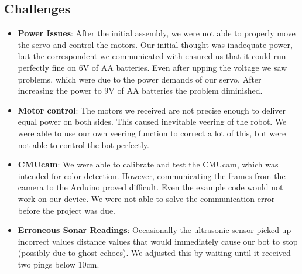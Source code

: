 \documentclass[11pt]{article}
\begin{document}
	\subsection{Challenges}
		
		\begin{itemize}				
		\item \textbf{Power Issues}: After the initial assembly, we were not able to properly move the servo and control the motors.  Our initial thought was inadequate power, but the correspondent we communicated with ensured us that it could run perfectly fine on 6V of AA batteries.  Even after upping the voltage we saw problems, which were due to the power demands of our servo.  After increasing the power to 9V of AA batteries the problem diminished.
		\item \textbf{Motor control}: The motors we received are not precise enough to deliver equal power on both sides.  This caused inevitable veering of the robot.  We were able to use our own veering function to correct a lot of this, but were not able to control the bot perfectly.
		\item \textbf{CMUcam}: We were able to calibrate and test the CMUcam, which was intended for color detection.  However, communicating the frames from the camera to the Arduino proved difficult.  Even the example code would not work on our device. We were not able to solve the communication error before the project was due.
		\item \textbf{Erroneous Sonar Readings}: Occasionally the ultrasonic sensor picked up incorrect values distance values that would immediately cause our bot to stop (possibly due to ghost echoes).  We adjusted this by waiting until it received two pings below 10cm.
		\end{itemize}
\end{document}
